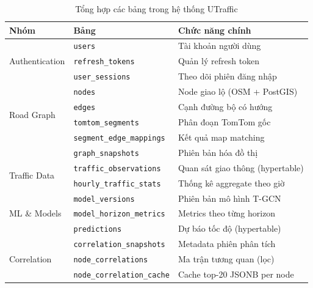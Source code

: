 \begin{table}[H]
\centering
\caption{Tổng hợp các bảng trong hệ thống UTraffic}
\begin{tabular}{|l|l|p{6cm}|}
\hline
\textbf{Nhóm} & \textbf{Bảng} & \textbf{Chức năng chính} \\
\hline
\multirow{3}{*}{Authentication} & \texttt{users} & Tài khoản người dùng \\
 & \texttt{refresh\_tokens} & Quản lý refresh token \\
 & \texttt{user\_sessions} & Theo dõi phiên đăng nhập \\
\hline
\multirow{4}{*}{Road Graph} & \texttt{nodes} & Node giao lộ (OSM + PostGIS) \\
 & \texttt{edges} & Cạnh đường bộ có hướng \\
 & \texttt{tomtom\_segments} & Phân đoạn TomTom gốc \\
 & \texttt{segment\_edge\_mappings} & Kết quả map matching \\
 & \texttt{graph\_snapshots} & Phiên bản hóa đồ thị \\
\hline
\multirow{2}{*}{Traffic Data} & \texttt{traffic\_observations} & Quan sát giao thông (hypertable) \\
 & \texttt{hourly\_traffic\_stats} & Thống kê aggregate theo giờ \\
\hline
\multirow{3}{*}{ML \& Models} & \texttt{model\_versions} & Phiên bản mô hình T-GCN \\
 & \texttt{model\_horizon\_metrics} & Metrics theo từng horizon \\
 & \texttt{predictions} & Dự báo tốc độ (hypertable) \\
\hline
\multirow{3}{*}{Correlation} & \texttt{correlation\_snapshots} & Metadata phiên phân tích \\
 & \texttt{node\_correlations} & Ma trận tương quan (lọc) \\
 & \texttt{node\_correlation\_cache} & Cache top-20 JSONB per node \\
\hline
\end{tabular}
\end{table}